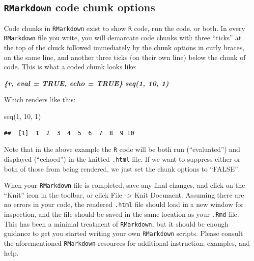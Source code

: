 \documentclass[
]{book}
\newenvironment{Shaded}{\begin{snugshade}}{\end{snugshade}}
\newcommand{\DecValTok}[1]{\textcolor[rgb]{0.00,0.00,0.81}{#1}}
\newcommand{\FunctionTok}[1]{\textcolor[rgb]{0.00,0.00,0.00}{#1}}
\newcommand{\InformationTok}[1]{\textcolor[rgb]{0.56,0.35,0.01}{\textbf{\textit{#1}}}}
\newcommand{\NormalTok}[1]{#1}
\begin{document}
\hypertarget{rmarkdown-code-chunk-options}{%
\subsection{\texorpdfstring{\texttt{RMarkdown} code chunk options}{RMarkdown code chunk options}}\label{rmarkdown-code-chunk-options}}

Code chunks in \texttt{RMarkdown} exist to show \texttt{R} code, run the code, or both. In every \texttt{RMarkdown} file you write, you will demarcate code chunks with three ``ticks'' at the top of the chuck followed immediately by the chunk options in curly braces, on the same line, and another three ticks (on their own line) below the chunk of code. This is what a coded chunk looks like:

\begin{Shaded}
\begin{Highlighting}[]
\InformationTok{\textasciigrave{}\textasciigrave{}\textasciigrave{}\{r, eval = TRUE, echo = TRUE\}}
\InformationTok{seq(1, 10, 1)}
\InformationTok{\textasciigrave{}\textasciigrave{}\textasciigrave{}}
\end{Highlighting}
\end{Shaded}

Which renders like this:

\begin{Shaded}
\begin{Highlighting}[]
\FunctionTok{seq}\NormalTok{(}\DecValTok{1}\NormalTok{, }\DecValTok{10}\NormalTok{, }\DecValTok{1}\NormalTok{)}
\end{Highlighting}
\end{Shaded}

\begin{verbatim}
##  [1]  1  2  3  4  5  6  7  8  9 10
\end{verbatim}

Note that in the above example the \texttt{R} code will be both run (``evaluated'') and displayed (``echoed'') in the knitted \texttt{.html} file. If we want to suppress either or both of those from being rendered, we just set the chunk options to ``FALSE''.

When your \texttt{RMarkdown} file is completed, save any final changes, and click on the ``Knit'' icon in the toolbar, or click File -\textgreater{} Knit Document. Assuming there are no errors in your code, the rendered \texttt{.html} file should load in a new window for inspection, and the file should be saved in the same location as your \texttt{.Rmd} file. This has been a minimal treatment of \texttt{RMarkdown}, but it should be enough guidance to get you started writing your own \texttt{RMarkdown} scripts. Please consult the aforementioned \texttt{RMarkdown} resources for additional instruction, examples, and help.
\end{document}
